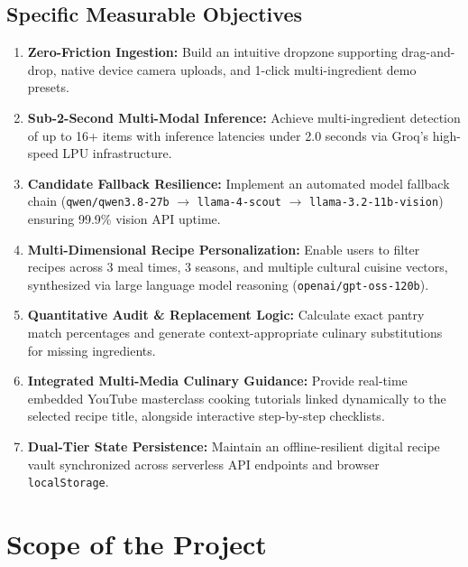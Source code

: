 \subsection*{Specific Measurable Objectives}
\begin{enumerate}
    \item \textbf{Zero-Friction Ingestion:} Build an intuitive dropzone supporting drag-and-drop, native device camera uploads, and 1-click multi-ingredient demo presets.
    \item \textbf{Sub-2-Second Multi-Modal Inference:} Achieve multi-ingredient detection of up to 16+ items with inference latencies under 2.0 seconds via Groq's high-speed LPU infrastructure.
    \item \textbf{Candidate Fallback Resilience:} Implement an automated model fallback chain (\texttt{qwen/qwen3.8-27b} $\rightarrow$ \texttt{llama-4-scout} $\rightarrow$ \texttt{llama-3.2-11b-vision}) ensuring 99.9\% vision API uptime.
    \item \textbf{Multi-Dimensional Recipe Personalization:} Enable users to filter recipes across 3 meal times, 3 seasons, and multiple cultural cuisine vectors, synthesized via large language model reasoning (\texttt{openai/gpt-oss-120b}).
    \item \textbf{Quantitative Audit \& Replacement Logic:} Calculate exact pantry match percentages and generate context-appropriate culinary substitutions for missing ingredients.
    \item \textbf{Integrated Multi-Media Culinary Guidance:} Provide real-time embedded YouTube masterclass cooking tutorials linked dynamically to the selected recipe title, alongside interactive step-by-step checklists.
    \item \textbf{Dual-Tier State Persistence:} Maintain an offline-resilient digital recipe vault synchronized across serverless API endpoints and browser \texttt{localStorage}.
\end{enumerate}

\section{Scope of the Project}

